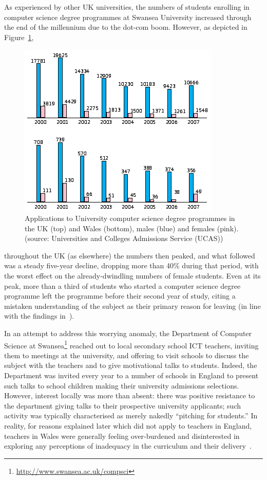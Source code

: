 \documentclass{sig-alternate}
\begin{document}
As experienced by other UK universities, the numbers of students
enrolling in computer science degree programmes at Swansea University
increased through the end of the millennium due to the dot-com boom.
However, as depicted in Figure~\ref{fig:numbers},
\begin{figure}%
  \centering
  \includegraphics[width=0.9\columnwidth]{images/numbers.png}
  \caption{Applications to University computer science degree programmes
           in the UK (top) and Wales (bottom), males (blue) and females (pink).
           (source: Universities and Colleges Admissions Service
           (UCAS))}
  \label{fig:numbers}
\end{figure}
throughout the UK
(as elsewhere) the numbers then peaked, and what followed was a steady
five-year decline, dropping more than 40\% during that period, with
the worst effect on the already-dwindling numbers of female students.
Even at its peak, more than a third of students who started a computer
science degree programme left the programme before their second year
of study, citing a mistaken understanding of the subject as their
primary reason for leaving
(in line with the findings in~\cite{brown-et-al-toce2014}).

In an attempt to address this worrying anomaly, the Department of
Computer Science at
Swansea\footnote{\url{http://www.swansea.ac.uk/compsci}} reached out
to local secondary school ICT teachers, inviting them to meetings at
the university, and offering to visit schools to discuss the subject
with the teachers and to give motivational talks to students. Indeed,
the Department was invited every year to a number of schools in
England to present such talks to school children making their
university admissions selections.  However, interest locally was more
than absent: there was positive resistance to the department giving
talks to their prospective university applicants; such activity was
typically characterised as merely nakedly ``pitching for students.''
In reality, for reasons explained later which did not apply to
teachers in England, teachers in Wales were generally feeling
over-burdened and disinterested in exploring any perceptions of
inadequacy in the curriculum and their
delivery~\cite{crick+sentance:2011,boyle-et-al:2012,brown-et-al-toce2014}.
\end{document}
